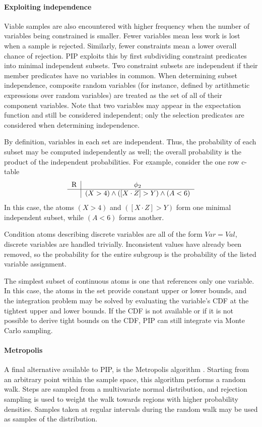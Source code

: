 \paragraph{Exploiting independence}
\label{subsec:independence}
Viable samples are also encountered with higher frequency when the number of variables being constrained is smaller.  Fewer variables mean less work is lost when a sample is rejected.  Similarly, fewer constraints mean a lower overall chance of rejection.  PIP exploits this by first subdividing constraint predicates into minimal independent subsets.  Two constraint subsets are independent if their member predicates have no variables in common.  When determining subset independence, composite random variables (for instance, defined by artithmetic expressions over random variables) are treated as the set of all of their component variables.  Note that two variables may appear in the expectation function and still be considered independent; only the selection predicates are considered when determining independence.

By definition, variables in each set are independent.  Thus, the probability of each subset may be computed independently as well; the overall probability is the product of the independent probabilities.  For example, consider the one row c-table 
\[
\begin{tabular}{c|c}
R & $\phi_2$ \\
\hline
& $(X > 4) \wedge ([X\cdot Z] > Y) \wedge (A < 6)$ \\
\end{tabular}
\]
In this case, the atoms $(X > 4)$ and $([X\cdot Z] > Y)$ form one minimal independent subset, while $(A < 6)$ forms another.

Condition atoms describing discrete variables are all of the form $Var = Val$, discrete variables are handled trivially.  Inconsistent values have already been removed, so the probability for the entire subgroup is the probability of the listed variable assignment.

The simplest subset of continuous atoms is one that references only one variable.  In this case, the atoms in the set provide constant upper or lower bounds, and the integration problem may be solved by evaluating the variable's CDF at the tightest upper and lower bounds.  If the CDF is not available or if it is not possible to derive tight bounds on the CDF, PIP can still integrate via Monte Carlo sampling.  

\paragraph{Metropolis}
A final alternative available to PIP, is the
Metropolis  algorithm \cite{metropolis}.   Starting from  an arbitrary
point within the sample space,  this algorithm performs a random walk.
Steps  are  sampled  from  a  multivariate  normal  distribution,  and
rejection sampling  is used  to weight the  walk towards  regions with
higher  probability  densities.  Samples  taken  at regular  intervals
during the random walk may be used as samples of the distribution.

